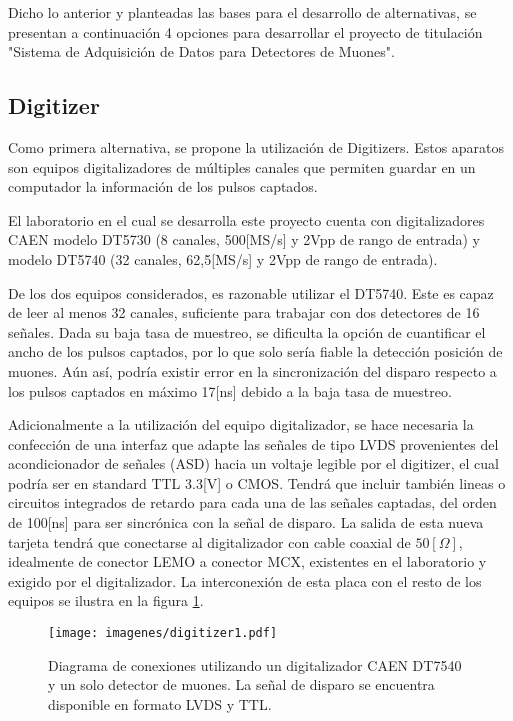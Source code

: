 \par Dicho lo anterior y planteadas las bases para el desarrollo de alternativas, se presentan a continuación 4 opciones para desarrollar el proyecto de titulación "Sistema de Adquisición de Datos para Detectores de Muones".


\newpage
\subsection{Digitizer}
Como primera alternativa, se propone la utilización de Digitizers. Estos aparatos son equipos digitalizadores de múltiples canales que permiten guardar en un computador la información de los pulsos captados.
\par El laboratorio en el cual se desarrolla este proyecto cuenta con digitalizadores CAEN modelo DT5730 (8 canales, 500[MS/s] y 2Vpp de rango de entrada) y modelo DT5740 (32 canales, 62,5[MS/s] y 2Vpp de rango de entrada). 
\par De los dos equipos considerados, es razonable utilizar el DT5740. Este es capaz de leer al menos 32 canales, suficiente para trabajar con dos detectores de 16 señales. Dada su baja tasa de muestreo, se dificulta la opción de cuantificar el ancho de los pulsos captados, por lo que solo sería fiable la detección posición de muones. Aún así, podría existir error en la sincronización del disparo respecto a los pulsos captados en máximo 17[ns] debido a la baja tasa de muestreo.

\par Adicionalmente a la utilización del equipo digitalizador, se hace necesaria la confección de una interfaz que adapte las señales de tipo LVDS provenientes del acondicionador de señales (ASD) hacia un voltaje legible por el digitizer, el cual podría ser en standard TTL 3.3[V] o CMOS. Tendrá que incluir también lineas o circuitos integrados de retardo para cada una de las señales captadas, del orden de 100[ns] para ser sincrónica con la señal de disparo. La salida de esta nueva tarjeta tendrá que conectarse al digitalizador con cable coaxial de $50[\Omega]$, idealmente de conector LEMO a conector MCX, existentes en el laboratorio y exigido por el digitalizador. La interconexión de esta placa con el resto de los equipos se ilustra en la figura \ref{fig:digitizer1}.

\begin{figure}[H]
    \centering
    \texttt{[image: imagenes/digitizer1.pdf]}
    \caption{Diagrama de conexiones utilizando un digitalizador CAEN DT7540 y un solo detector de muones. La señal de disparo se encuentra disponible en formato LVDS y TTL.}
    \label{fig:digitizer1}
\end{figure}


